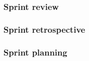 \subsubsection{Sprint review}

\subsubsection{Sprint retrospective}

\subsubsection{Sprint planning}


